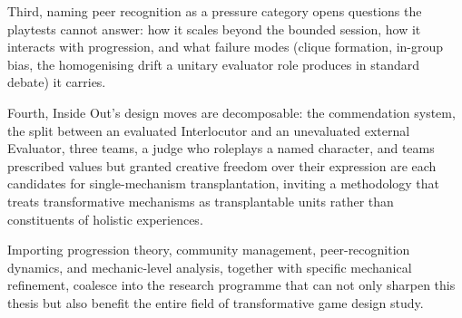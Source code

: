 Third, naming peer recognition as a pressure category opens questions the playtests cannot answer: how it scales beyond the bounded session, how it interacts with progression, and what failure modes (clique formation, in-group bias, the homogenising drift a unitary evaluator role produces in standard debate) it carries.

Fourth, Inside Out's design moves are decomposable: the commendation system, the split between an evaluated Interlocutor and an unevaluated external Evaluator, three teams, a judge who roleplays a named character, and teams prescribed values but granted creative freedom over their expression are each candidates for single-mechanism transplantation, inviting a methodology that treats transformative mechanisms as transplantable units rather than constituents of holistic experiences. 

Importing progression theory, community management, peer-recognition dynamics, and mechanic-level analysis, together with specific mechanical refinement, coalesce into the research programme that can not only sharpen this thesis but also benefit the entire field of transformative game design study.
